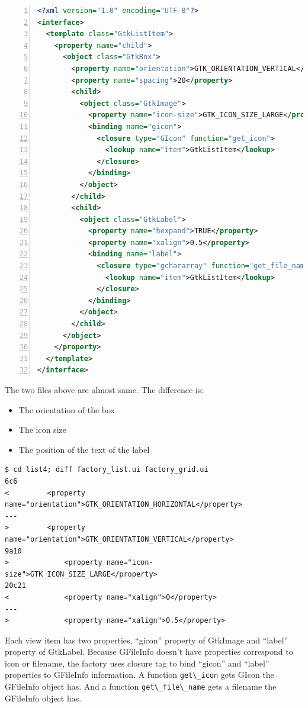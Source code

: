 \begin{lstlisting}[language=XML, numbers=left]
<?xml version="1.0" encoding="UTF-8"?>
<interface>
  <template class="GtkListItem">
    <property name="child">
      <object class="GtkBox">
        <property name="orientation">GTK_ORIENTATION_VERTICAL</property>
        <property name="spacing">20</property>
        <child>
          <object class="GtkImage">
            <property name="icon-size">GTK_ICON_SIZE_LARGE</property>
            <binding name="gicon">
              <closure type="GIcon" function="get_icon">
                <lookup name="item">GtkListItem</lookup>
              </closure>
            </binding>
          </object>
        </child>
        <child>
          <object class="GtkLabel">
            <property name="hexpand">TRUE</property>
            <property name="xalign">0.5</property>
            <binding name="label">
              <closure type="gchararray" function="get_file_name">
                <lookup name="item">GtkListItem</lookup>
              </closure>
            </binding>
          </object>
        </child>
      </object>
    </property>
  </template>
</interface>
\end{lstlisting}

The two files above are almost same. The difference is:

\begin{itemize}
\tightlist
\item
  The orientation of the box
\item
  The icon size
\item
  The position of the text of the label
\end{itemize}

\begin{lstlisting}
$ cd list4; diff factory_list.ui factory_grid.ui
6c6
<         <property name="orientation">GTK_ORIENTATION_HORIZONTAL</property>
---
>         <property name="orientation">GTK_ORIENTATION_VERTICAL</property>
9a10
>             <property name="icon-size">GTK_ICON_SIZE_LARGE</property>
20c21
<             <property name="xalign">0</property>
---
>             <property name="xalign">0.5</property>
\end{lstlisting}

Each view item has two properties, ``gicon'' property of GtkImage and
``label'' property of GtkLabel. Because GFileInfo doesn't have
properties correspond to icon or filename, the factory uses closure tag
to bind ``gicon'' and ``label'' properties to GFileInfo information. A
function \passthrough{\lstinline!get\_icon!} gets GIcon the GFileInfo
object has. And a function \passthrough{\lstinline!get\_file\_name!}
gets a filename the GFileInfo object has.

